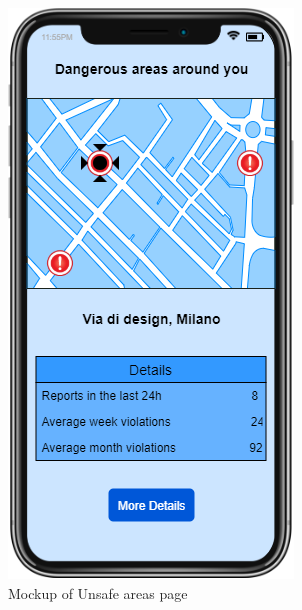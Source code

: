 	\begin{figure}[h!]
		\centering
		\includegraphics[scale=0.75]{Images/Unsafe_Mockup}
		\caption{Mockup of Unsafe areas page}
	\end{figure}
	\newpage
